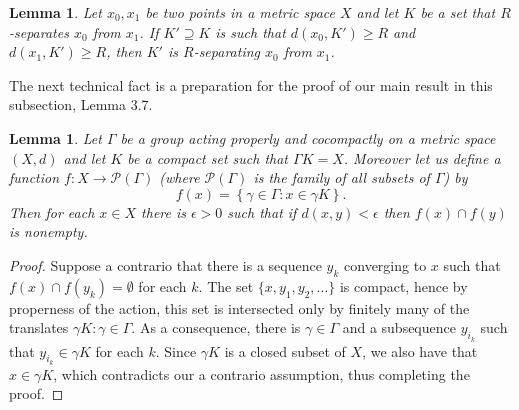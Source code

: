 \documentclass[12pt, a4paper]{article}
\newcommand{\8}{\infty}
\newcommand{\set}[1]{\left\{ #1 \right\}}
\theoremstyle{break}
\newtheorem{lm}[thm]{Lemma}
\theoremstyle{defbreak}
\begin{document}

\medskip
\begin{lm}\label{lemma:enlarging_R-separating_set}
    Let $x_0, x_1$ be two points in a metric space $X$ and let $K$ be a set that $R$-separates $x_0$ from $x_1$. If $K'\supseteq K$ is such that $d(x_0,K')\geqslant R$ and $d(x_1,K') \geqslant R$, then $K'$ is $R$-separating $x_0$ from $x_1$.
\end{lm}



The next technical fact is a preparation for the proof of our main result in this subsection, Lemma 3.7. 

\medskip
\begin{lm} \label{lemma:continuous-change-of-covering-set}
    Let $\Gamma$ be a group acting properly and cocompactly on a 
    metric space $(X,d)$ and let $K$ be a compact set such that $\Gamma K = X$. Moreover let us define a function $f: X \to \mathscr{P}(\Gamma)$ (where $\mathscr{P}(\Gamma)$ is the family of all subsets of $\Gamma$) by
    $$f(x) = \set{\gamma\in \Gamma: x\in \gamma K}.$$
    Then for each $x\in X$ there is $\epsilon>0$ such that if $d(x,y)<\epsilon$
    then $f(x)\cap f(y)$ is nonempty.
\end{lm}

\begin{proof}
Suppose a contrario that there is a sequence $y_k$ converging to $x$
such that $f(x)\cap f(y_k)=\emptyset$ for each $k$. 
The set $\{ x,y_1,y_2,\dots \}$ is compact, hence
by properness of the action, this set is intersected only by finitely many
of the translates $\gamma K:\gamma\in\Gamma$.
As a consequence, there is $\gamma\in\Gamma$ and a subsequence
$y_{i_k}$ such that $y_{i_k}\in\gamma K$ for each $k$.
Since $\gamma K$ is a closed subset of $X$, we also have that $x\in\gamma K$, which contradicts our a contrario assumption, thus completing the proof.
\end{proof}
\end{document}
